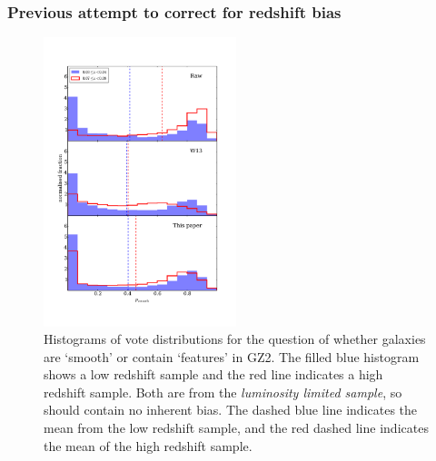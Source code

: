 \documentclass[useAMS,usenatbib]{mn2e}
\begin{document}
\subsubsection{Previous attempt to correct for redshift bias}
\label{sec:previous_method}

\begin{figure}
		\centering

        \includegraphics[width=0.5\textwidth]{Data_imgs/vote_distribution_histograms.pdf}

        \caption{Histograms of vote distributions for the question of whether galaxies are `smooth' or contain `features' in GZ2. The filled blue histogram shows a low redshift sample and the red line indicates a high redshift sample. Both are from the \textit{luminosity limited sample}, so should contain no inherent bias. The dashed blue line indicates the mean from the low redshift sample, and the red dashed line indicates the mean of the high redshift sample.}

        \label{fig:vote_histograms}

\end{figure}
\end{document}
